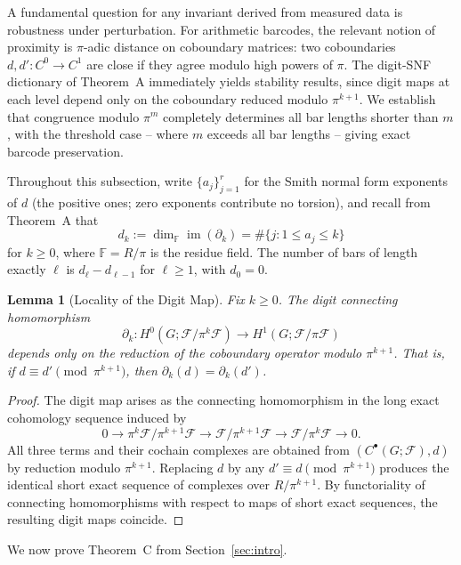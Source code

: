 \documentclass[11pt]{amsart}
\theoremstyle{plain}
\newtheorem{lemma}[theorem]{Lemma}
\theoremstyle{definition}
\newcommand{\Ring}{R}                          %
\newcommand{\unif}{\pi}                        %
\newcommand{\sheaf}[1]{\mathcal{#1}}                  %
\newcommand{\Digit}[1]{\partial_{#1}}%
\newcommand{\coboundary}{d}                           %
\DeclareMathOperator{\im}{im}                         %
\begin{document}
A fundamental question for any invariant derived from measured data is robustness under perturbation. For arithmetic barcodes, the relevant notion of proximity is $\unif$-adic distance on coboundary matrices: two coboundaries $\coboundary, \coboundary': C^0 \to C^1$ are close if they agree modulo high powers of $\unif$. The digit-SNF dictionary of Theorem~A immediately yields stability results, since digit maps at each level depend only on the coboundary reduced modulo $\unif^{k+1}$. We establish that congruence modulo $\unif^m$ completely determines all bar lengths shorter than $m$, with the threshold case -- where $m$ exceeds all bar lengths -- giving exact barcode preservation.

Throughout this subsection, write $\{a_j\}_{j=1}^r$ for the Smith normal form exponents of $\coboundary$ (the positive ones; zero exponents contribute no torsion), and recall from Theorem~A that
\[
d_k := \dim_{\mathbb{F}} \im(\Digit{k}) = \#\{j : 1 \le a_j \le k\}
\]
for $k \ge 0$, where $\mathbb{F} = \Ring/\unif$ is the residue field. The number of bars of length exactly $\ell$ is $d_\ell - d_{\ell-1}$ for $\ell \ge 1$, with $d_0 = 0$.

\begin{lemma}[Locality of the Digit Map]
\label{lem:digit-locality}
Fix $k \geq 0$. The digit connecting homomorphism
\[
\Digit{k}: H^0(G;\sheaf{F}/\unif^k\sheaf{F}) \longrightarrow H^1(G;\sheaf{F}/\unif\sheaf{F})
\]
depends only on the reduction of the coboundary operator modulo $\unif^{k+1}$. That is, if $\coboundary \equiv \coboundary' \pmod{\unif^{k+1}}$, then $\Digit{k}(\coboundary) = \Digit{k}(\coboundary')$.
\end{lemma}

\begin{proof}
The digit map arises as the connecting homomorphism in the long exact cohomology sequence induced by
\[
0 \to \unif^k\sheaf{F}/\unif^{k+1}\sheaf{F} \longrightarrow \sheaf{F}/\unif^{k+1}\sheaf{F} \longrightarrow \sheaf{F}/\unif^k\sheaf{F} \to 0.
\]
All three terms and their cochain complexes are obtained from $(C^\bullet(G;\sheaf{F}),\coboundary)$ by reduction modulo $\unif^{k+1}$. Replacing $\coboundary$ by any $\coboundary' \equiv \coboundary \pmod{\unif^{k+1}}$ produces the identical short exact sequence of complexes over $\Ring/\unif^{k+1}$. By functoriality of connecting homomorphisms with respect to maps of short exact sequences, the resulting digit maps coincide.
\end{proof}

We now prove Theorem~C from Section~\ref{sec:intro}.
\end{document}
